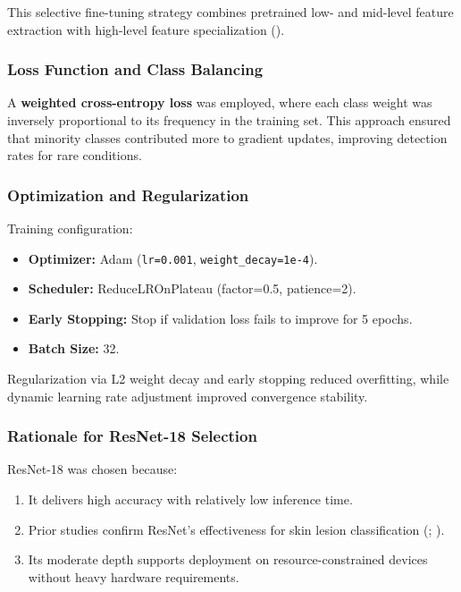 \documentclass[
  12pt,
  oneside]{article}
\providecommand{\tightlist}{%
  \setlength{\itemsep}{0pt}\setlength{\parskip}{0pt}}
\begin{document}
This selective fine-tuning strategy combines pretrained low- and
mid-level feature extraction with high-level feature specialization
().

\subsubsection{Loss Function and Class
Balancing}\label{loss-function-and-class-balancing}

A \textbf{weighted cross-entropy loss} was employed, where each class
weight was inversely proportional to its frequency in the training set.
This approach ensured that minority classes contributed more to gradient
updates, improving detection rates for rare conditions.

\subsubsection{Optimization and
Regularization}\label{optimization-and-regularization}

Training configuration:

\begin{itemize}
\tightlist
\item
  \textbf{Optimizer:} Adam (\texttt{lr=0.001},
  \texttt{weight\_decay=1e-4}).
\item
  \textbf{Scheduler:} ReduceLROnPlateau (factor=0.5, patience=2).
\item
  \textbf{Early Stopping:} Stop if validation loss fails to improve for
  5 epochs.
\item
  \textbf{Batch Size:} 32.
\end{itemize}

Regularization via L2 weight decay and early stopping reduced
overfitting, while dynamic learning rate adjustment improved convergence
stability.

\subsubsection{Rationale for ResNet-18
Selection}\label{rationale-for-resnet-18-selection}

ResNet-18 was chosen because:

\begin{enumerate}
\def\labelenumi{\arabic{enumi}.}
\tightlist
\item
  It delivers high accuracy with relatively low inference time.
\item
  Prior studies confirm ResNet's effectiveness for skin lesion
  classification (;
  ).
\item
  Its moderate depth supports deployment on resource-constrained devices
  without heavy hardware requirements.
\end{enumerate}
\end{document}
